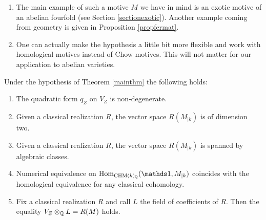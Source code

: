 \documentclass[11pt]{amsart}
\begin{document}
\begin{remark}\label{hypothesismainthm}
\begin{enumerate}
\item The main example of such a motive $M$ we have in mind is an exotic motive of an abelian fourfold (see Section \ref{sectionexotic}). Another example coming from geometry is given in Proposition \ref{propfermat}.
\item\label{homvsrat} One can actually make the  hypothesis a little bit more flexible and work with homological motives instead of Chow motives. This will not matter for our application to abelian varieties.
\end{enumerate}
\end{remark}
\begin{prop}\label{tortura}
Under the hypothesis of Theorem \ref{mainthm} the following holds:
\begin{enumerate}
\item The quadratic form $q_Z$   on $V_Z$ is non-degenerate. 
\item  Given a classical realization $R$, the vector space $R(M_{\vert{k}})$  is of dimension two.
\item Given a classical realization $R$, the vector space $R(M_{\vert{k}})$ is spanned by algebraic classes.
\item Numerical equivalence on $\Hom_{\CHM(k)_\Q}(\one,M_{\vert{k}})$ coincides with the homological equivalence for any classical cohomology.
\item\label{giorno} Fix a classical realization $R$ and call $L$ the field of coefficients of  $R$. Then the equality $V_Z\otimes _{\mathbb{Q}} L = R(M)$ holds.

\end{enumerate}
\end{prop}
\end{document}
